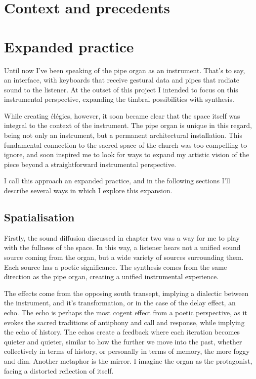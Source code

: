 \documentclass[12pt,twoside,maitrise]{dms_ks}
\theoremstyle{definition}
\begin{document}

\section{Context and precedents}

\section{Expanded practice}

Until now I've been speaking of the pipe organ as an instrument. That's to say, an interface, with keyboards that receive gestural data and pipes that radiate sound to the listener. At the outset of this project I intended to focus on this instrumental perspective, expanding the timbral possibilities with synthesis.

While creating élégies, however, it soon became clear that the space itself was integral to the context of the instrument. The pipe organ is unique in this regard, being not only an instrument, but a permanent architectural installation. This fundamental connection to the sacred space of the church was too compelling to ignore, and soon inspired me to look for ways to expand my artistic vision of the piece beyond a straightforward instrumental perspective.

I call this approach an expanded practice, and in the following sections I'll describe several ways in which I explore this expansion.

\subsection{Spatialisation}

Firstly, the sound diffusion discussed in chapter two was a way for me to play with the fullness of the space. In this way, a listener hears not a unified sound source coming from the organ, but a wide variety of sources surrounding them. Each source has a poetic significance. The synthesis comes from the same direction as the pipe organ, creating a unified instrumental experience.

The effects come from the opposing south transept, implying a dialectic between the instrument, and it's transformation, or in the case of the delay effect, an echo. The echo is perhaps the most cogent effect from a poetic perspective, as it evokes the sacred traditions of antiphony and call and response, while implying the echo of history. The echos create a feedback where each iteration becomes quieter and quieter, similar to how the further we move into the past, whether collectively in terms of history, or personally in terms of memory, the more foggy and dim. Another metaphor is the mirror. I imagine the organ as the protagonist, facing a distorted reflection of itself.
\end{document}
